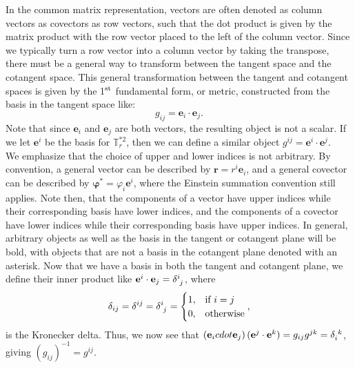 \begin{appendices}
In the common matrix representation, vectors are often denoted as column vectors as covectors as row vectors, such that the dot product is given by the matrix product with the row vector placed to the left of the column vector.
Since we typically turn a row vector into a column vector by taking the transpose, there must be a general way to transform between the tangent space and the cotangent space.
This general transformation between the tangent and cotangent spaces is given by the 1$^{\rm st}$ fundamental form, or metric, constructed from the basis in the tangent space like:
\begin{equation}
  g_{ij} = \mathbf{e}_i \cdot \mathbf{e}_j.\label{e:A-metric}
\end{equation}
Note that since $\mathbf{e}_i$ and $\mathbf{e}_j$ are both vectors, the resulting object is not a scalar.
If we let $\mathbf{e}^i$ be the basis for $\mathbb{T}^{*2}_r$, then we can define a similar object $g^{ij} = \mathbf{e}^i \cdot \mathbf{e}^j$. \\

We emphasize that the choice of upper and lower indices is not arbitrary.
By convention, a general vector can be described by $\mathbf{r} = r^{i}\mathbf{e}_i$, and a general covector can be described by $\bm{\varphi}^* = \varphi_{i}\mathbf{e}^i$, where the Einstein summation convention still applies.
Note then, that the components of a vector have upper indices while their corresponding basis have lower indices, and the components of a covector have lower indices while their corresponding basis have upper indices.
In general, arbitrary objects as well as the basis in the tangent or cotangent plane will be bold, with objects that are not a basis in the cotangent plane denoted with an asterisk.
Now that we have a basis in both the tangent and cotangent plane, we define their inner product like $\mathbf{e}^i \cdot \mathbf{e}_j = \tensor{\delta}{^i_j}$, where
\begin{equation}
  \delta_{ij} = \delta^{ij} = \tensor{\delta}{^i_j} = \begin{cases}
    1, & \textrm{if } i = j \\
    0, & \textrm{otherwise}
  \end{cases},
\end{equation}
is the Kronecker delta.
Thus, we now see that $(\mathbf{e}_i cdot \mathbf{e}_j) \, (\mathbf{e}^j \cdot \mathbf{e}^k) = g_{ij}g^{jk} = \tensor{\delta}{_i^k}$, giving $(g_{ij})^{-1} = g^{ij}$. \\


\end{appendices}
